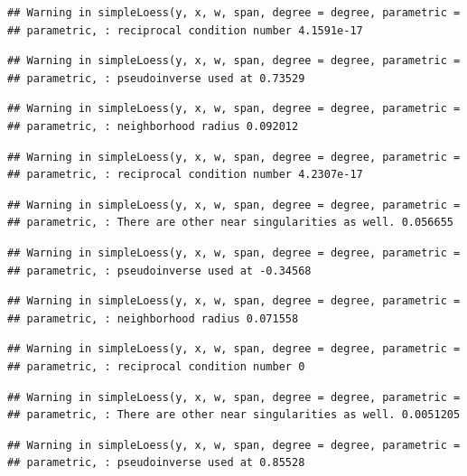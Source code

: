 \documentclass[]{article}
\begin{document}
\begin{verbatim}
## Warning in simpleLoess(y, x, w, span, degree = degree, parametric =
## parametric, : reciprocal condition number 4.1591e-17
\end{verbatim}

\begin{verbatim}
## Warning in simpleLoess(y, x, w, span, degree = degree, parametric =
## parametric, : pseudoinverse used at 0.73529
\end{verbatim}

\begin{verbatim}
## Warning in simpleLoess(y, x, w, span, degree = degree, parametric =
## parametric, : neighborhood radius 0.092012
\end{verbatim}

\begin{verbatim}
## Warning in simpleLoess(y, x, w, span, degree = degree, parametric =
## parametric, : reciprocal condition number 4.2307e-17
\end{verbatim}

\begin{verbatim}
## Warning in simpleLoess(y, x, w, span, degree = degree, parametric =
## parametric, : There are other near singularities as well. 0.056655
\end{verbatim}

\begin{verbatim}
## Warning in simpleLoess(y, x, w, span, degree = degree, parametric =
## parametric, : pseudoinverse used at -0.34568
\end{verbatim}

\begin{verbatim}
## Warning in simpleLoess(y, x, w, span, degree = degree, parametric =
## parametric, : neighborhood radius 0.071558
\end{verbatim}

\begin{verbatim}
## Warning in simpleLoess(y, x, w, span, degree = degree, parametric =
## parametric, : reciprocal condition number 0
\end{verbatim}

\begin{verbatim}
## Warning in simpleLoess(y, x, w, span, degree = degree, parametric =
## parametric, : There are other near singularities as well. 0.0051205
\end{verbatim}

\begin{verbatim}
## Warning in simpleLoess(y, x, w, span, degree = degree, parametric =
## parametric, : pseudoinverse used at 0.85528
\end{verbatim}
\end{document}

